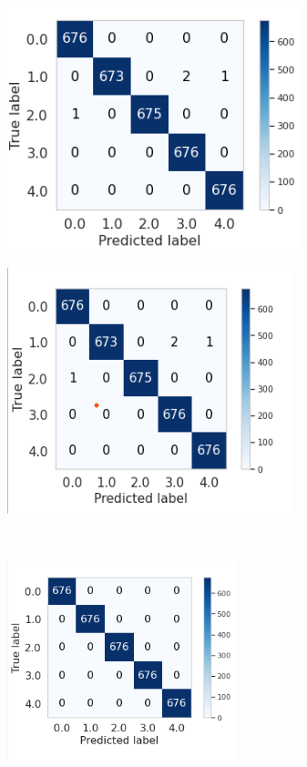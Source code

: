 \begin{figure}[H]
    \centering
    \begin{subfigure}{.55\textwidth}
        \centering
        \includegraphics[width=.55\linewidth]{figures/lgbm_train.png}
        \caption{}
        \label{fig:sub1}
    \end{subfigure}%
    \begin{subfigure}{.55\textwidth}
        \setcounter{subfigure}{1} %
        \centering
        \includegraphics[width=.55\linewidth]{figures/lgbm_hgb_train.png}
        \caption{}
        \label{fig:sub2}
    \end{subfigure}\\
    \begin{subfigure}{.55\textwidth}
        \setcounter{subfigure}{2} %
        \centering
        \includegraphics[width=.55\linewidth]{figures/hgb_train.png}

\end{subfigure}
\end{figure}
